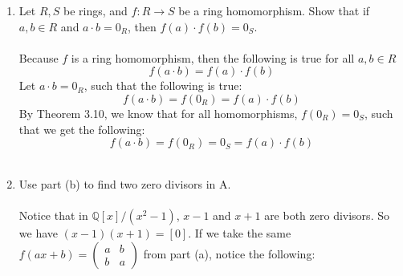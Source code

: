 \documentclass[12pt]{article}
\begin{document}
\begin{enumerate}[label = (\alph*)]
\begin{proof}
\begin{align*}
				f(ax+b)f(cx + d) &= 
				\begin{pmatrix}
				a & b \\ b & a
				\end{pmatrix}
				\begin{pmatrix}
				c & d \\ d & c
				\end{pmatrix} = 
				\begin{pmatrix}
				ac + bd & ad + bc \\ ad + bc & ac + bd
				\end{pmatrix} \\
				&= f((ac+bd)x + (ad + bc)) = f(adx^2 + acx + bdx + bc) \\
				&= f((ax + b)(dx + c)) = f((ax + b)(cx + d))
			\end{align*}
		Because we are in $\mathbb{Q}[x]/(x^2 - 1)$, the following is true: $[x^2] = [1]$ and $[x] = 1$.  Thus allowing us to say $ad = adx^2$ and $dx + c = cx + d$
		\\ \\
		\textbf{\boldmath Because $f:\mathbb{Q}[x]/(x^2 - 1) \rightarrow A$ is bijective and satisfies the homomorphic properties, $\mathbb{Q}[x]/(x^2 - 1) \cong A$} \\
	\end{proof}
	\newpage
	\item Let $R, S$ be rings, and $f : R \rightarrow S$ be a ring homomorphism. Show that if $a, b \in R $ and
	$a \cdot b = 0_R$, then $f(a) \cdot f(b) = 0_S$.
	\\ \\
	Because $f$ is a ring homomorphism, then the following is true for all $a,b \in R$
		$$
		f(a \cdot b) = f(a) \cdot f(b)
		$$ 
	Let $a \cdot b = 0_R$, such that the following is true:
		$$
		f(a \cdot b) = f(0_R) = f(a) \cdot f(b) 
		$$
	By Theorem 3.10, we know that for all homomorphisms, $f(0_R) = 0_S$, such that we get the following:
		\boldmath
		$$
		f(a \cdot b) = f(0_R) = 0_S = f(a) \cdot f(b)
		$$
		\unboldmath 
	\\ 
	\item Use part (b) to find two zero divisors in A.
	\\ \\
	Notice that in $\mathbb{Q}[x]/(x^2 - 1)$, $x-1$ and $x+1$ are both zero divisors.  So we have $(x-1)(x+1) = [0]$.  If we take the same $f(ax + b) = \begin{pmatrix}
		a & b \\ b & a
	\end{pmatrix}$ from part (a), notice the following:

\end{enumerate}
\end{document}
